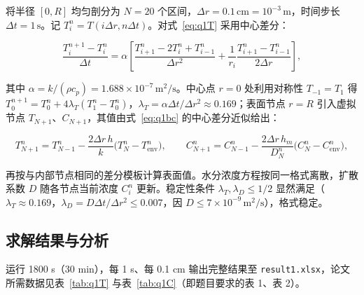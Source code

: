 \documentclass[withoutpreface,bwprint]{cumcmthesis} %
\begin{document}
将半径 $[0,R]$ 均匀剖分为 $N=20$ 个区间，$\Delta r=0.1\,\mathrm{cm}=10^{-3}\,\mathrm{m}$，时间步长 $\Delta t=1\,\mathrm{s}$。记 $T_i^n=T(i\Delta r,n\Delta t)$。对式~\eqref{eq:q1T} 采用中心差分：

\begin{equation}
\frac{T_i^{n+1}-T_i^n}{\Delta t}
= \alpha\left[\frac{T_{i+1}^n-2T_i^n+T_{i-1}^n}{\Delta r^2}
+\frac{1}{r_i}\frac{T_{i+1}^n-T_{i-1}^n}{2\Delta r}\right],
\label{eq:q1fd}
\end{equation}

其中 $\alpha=k/(\rho c_p)=1.688\times10^{-7}\,\mathrm{m^2/s}$。中心点 $r=0$ 处利用对称性 $T_{-1}=T_1$ 得 $T_0^{n+1}=T_0^n+4\lambda_T(T_1^n-T_0^n)$，$\lambda_T=\alpha\Delta t/\Delta r^2\approx0.169$；表面节点 $r=R$ 引入虚拟节点 $T_{N+1}$、$C_{N+1}$，其值由式~\eqref{eq:q1bc} 的中心差分近似给出：

\begin{equation}
T_{N+1}^n = T_{N-1}^n - \frac{2\Delta r\,h}{k}\bigl(T_N^n-T_{\mathrm{env}}^n\bigr),\qquad
C_{N+1}^n = C_{N-1}^n - \frac{2\Delta r\,h_m}{D_N^n}\bigl(C_N^n-C_{\mathrm{env}}^n\bigr),
\label{eq:q1ghost}
\end{equation}

再按与内部节点相同的差分模板计算表面值。水分浓度方程按同一格式离散，扩散系数 $D$ 随各节点当前浓度 $C_i^n$ 更新。稳定性条件 $\lambda_T,\lambda_D\le1/2$ 显然满足（$\lambda_T\approx0.169$，$\lambda_D=D\Delta t/\Delta r^2\le0.007$，因 $D\le7\times10^{-9}\,\mathrm{m^2/s}$），格式稳定。

\subsection{求解结果与分析}

运行 1800 s（30 min），每 1 s、每 0.1 cm 输出完整结果至 \texttt{result1.xlsx}，论文所需数据见表~\ref{tab:q1T} 与表~\ref{tab:q1C}（即题目要求的表 1、表 2）。
\end{document}
